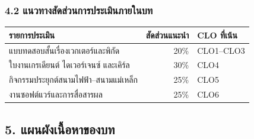 \subsubsection{4.2 แนวทางสัดส่วนการประเมินภายในบท}

\begin{table}[htbp]
    \centering
    \begin{tabular}{l r l}
        \hline
        \textbf{รายการประเมิน} & \textbf{สัดส่วนแนะนำ} & \textbf{CLO ที่เน้น} \\
        \hline
        แบบทดสอบสั้นเรื่องเวกเตอร์และพิกัด & 20\% & CLO1--CLO3 \\
        ใบงานเกรเดียนต์ ไดเวอร์เจนซ์ และเคิร์ล & 30\% & CLO4 \\
        กิจกรรมประยุกต์สนามไฟฟ้า--สนามแม่เหล็ก & 25\% & CLO5 \\
        งานซอฟต์แวร์และการสื่อสารผล & 25\% & CLO6 \\
        \hline
    \end{tabular}
\end{table}

\subsection{5. แผนผังเนื้อหาของบท}

